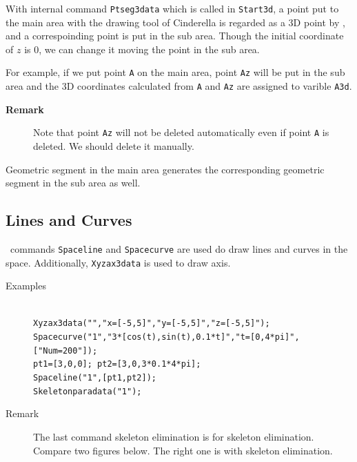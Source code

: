 \documentclass[papersize,a4paper,12pt]{article}
\begin{document}
With internal command \verb|Ptseg3data| which is called in \verb|Start3d|, 
a point put to the main area with the drawing tool of Cinderella is regarded as a 3D point by \ketcindy, and a correspoinding point is put in the sub area. 
Though the initial coordinate of $z$ is 0, we can change it moving the point in the sub area.

For example, if we put point \verb|A| on the main area, point \verb|Az| will be put in the sub area and the 3D coordinates calculated from \verb|A| and \verb|Az|  are assigned to varible \verb|A3d|.\vspace{-1mm}

\begin{description}
\item[\bf Remark]Note that point \verb|Az| will not be deleted automatically even if point \verb|A| is deleted. We should delete it manually.
\end{description}

Geometric segment in the main area generates the corresponding geometric segment in the sub area as well.

\subsection{Lines and Curves}

\ketcindy\ commands \verb|Spaceline| and \verb|Spacecurve| are used do draw lines and curves in the space. Additionally, \verb|Xyzax3data| is used to draw axis.

\begin{description}
\item[Examples]\mbox{}\\
\verb|Xyzax3data("","x=[-5,5]","y=[-5,5]","z=[-5,5]");|\\
\verb|Spacecurve("1","3*[cos(t),sin(t),0.1*t]","t=[0,4*pi]",["Num=200"]);|\\
\verb|pt1=[3,0,0]; pt2=[3,0,3*0.1*4*pi];|\\
\verb|Spaceline("1",[pt1,pt2]);|\\
\verb|Skeletonparadata("1");| 

\item[Remark]The last command skeleton elimination is for skeleton elimination.
Compare two figures below. The right one is with skeleton elimination.

\end{description}

\begin{center}
\hspace{10mm}
\end{center}
\end{document}
